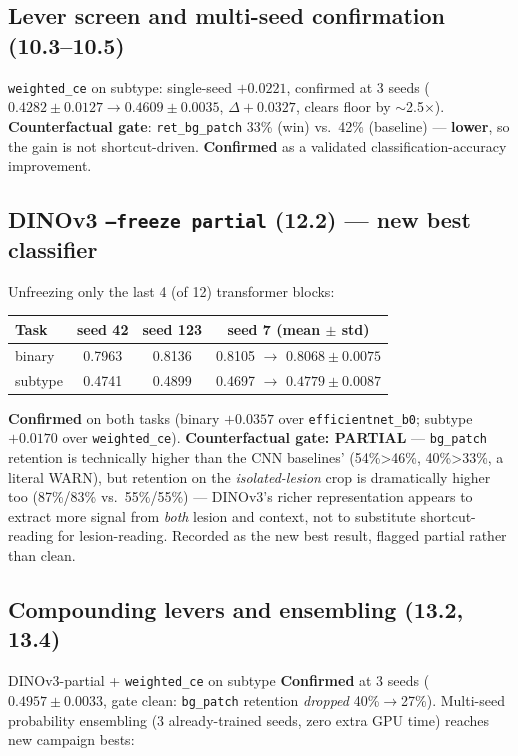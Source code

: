 \documentclass[10pt]{article}
\newcommand{\confirmed}{\textcolor{confirmgreen}{\textbf{Confirmed}}}
\begin{document}
\subsection{Lever screen and multi-seed confirmation (10.3--10.5)}

\texttt{weighted\_ce} on subtype: single-seed $+0.0221$, confirmed at 3 seeds
($0.4282\pm0.0127 \to 0.4609\pm0.0035$, $\Delta+0.0327$, clears floor by $\sim$2.5$\times$).
\textbf{Counterfactual gate}: \texttt{ret\_bg\_patch} 33\% (win) vs.\ 42\% (baseline) --- \textbf{lower}, so
the gain is not shortcut-driven. \confirmed{} as a validated classification-accuracy improvement.

\subsection{DINOv3 \texttt{--freeze partial} (12.2) --- new best classifier}

Unfreezing only the last 4 (of 12) transformer blocks:

\begin{center}
\begin{tabular}{lccc}
\toprule
Task & seed 42 & seed 123 & seed 7 (mean $\pm$ std) \\
\midrule
binary & 0.7963 & 0.8136 & 0.8105 $\to$ $\mathbf{0.8068\pm0.0075}$ \\
subtype & 0.4741 & 0.4899 & 0.4697 $\to$ $\mathbf{0.4779\pm0.0087}$ \\
\bottomrule
\end{tabular}
\end{center}

\confirmed{} on both tasks (binary $+0.0357$ over \texttt{efficientnet\_b0}; subtype $+0.0170$ over
\texttt{weighted\_ce}). \textbf{Counterfactual gate: PARTIAL} --- \texttt{bg\_patch} retention is technically
higher than the CNN baselines' (54\%>46\%, 40\%>33\%, a literal WARN), but retention on the
\emph{isolated-lesion} crop is dramatically higher too (87\%/83\% vs.\ 55\%/55\%) --- DINOv3's richer
representation appears to extract more signal from \emph{both} lesion and context, not to substitute
shortcut-reading for lesion-reading. Recorded as the new best result, flagged partial rather than clean.

\subsection{Compounding levers and ensembling (13.2, 13.4)}

DINOv3-partial + \texttt{weighted\_ce} on subtype \confirmed{} at 3 seeds ($0.4957\pm0.0033$, gate clean:
\texttt{bg\_patch} retention \emph{dropped} 40\%$\to$27\%). Multi-seed probability ensembling (3 already-trained
seeds, zero extra GPU time) reaches new campaign bests:
\end{document}
